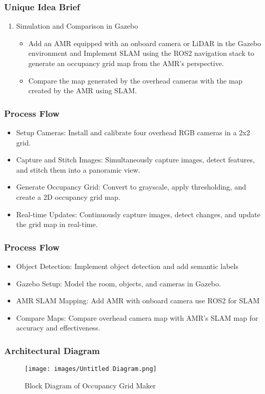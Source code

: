 \documentclass{beamer}
\begin{document}
\begin{frame}
  \frametitle{Unique Idea Brief}
  \begin{enumerate}
        \item Simulation and Comparison in Gazebo
    \begin{itemize}
    \item Add an AMR equipped with an onboard camera or LiDAR in the Gazebo environment and Implement SLAM using the ROS2 navigation stack to generate an occupancy grid map from the AMR's perspective.
    \item Compare the map generated by the overhead cameras with the map created by the AMR using SLAM.
  \end{itemize}
  \end{enumerate}
\end{frame}

\begin{frame}
  \frametitle{Process Flow}
    \begin{itemize}
      \item Setup Cameras: Install and calibrate four overhead RGB cameras in a 2x2 grid.
      \item Capture and Stitch Images: Simultaneously capture images, detect features, and stitch them into a panoramic view.
    \item Generate Occupancy Grid: Convert to grayscale, apply thresholding, and create a 2D occupancy grid map.
      \item Real-time Updates: Continuously capture images, detect changes, and update the grid map in real-time.
    \end{itemize}
\end{frame}

\begin{frame}
  \frametitle{Process Flow}
    \begin{itemize}
 \item Object Detection: Implement object detection and add semantic labels
    \item Gazebo Setup: Model the room, objects, and cameras in Gazebo.
      \item AMR SLAM Mapping: Add AMR with onboard camera use ROS2 for SLAM
      \item Compare Maps: Compare overhead camera map with AMR’s SLAM map for accuracy and effectiveness.
       \end{itemize}
\end{frame}
\begin{frame}

  \frametitle{Architectural Diagram }
  \begin{figure}
      \centering
      \texttt{[image: images/Untitled Diagram.png]}
      \caption{Block Diagram of Occupancy Grid Maker}
      \label{fig:enter-label}
  \end{figure}
\end{frame}
\end{document}
